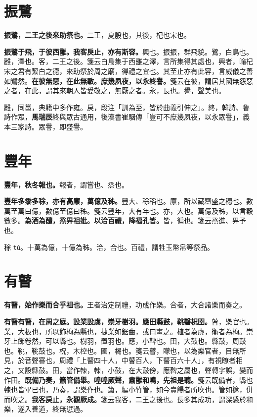 \section{振鷺}


\textbf{振鷺，二王之後來助祭也。}{\footnotesize 二王，夏殷也，其後，杞也宋也。}

\textbf{振鷺于飛，于彼西雝。我客戾止，亦有斯容。}{\footnotesize 興也。振振，群飛貌。鷺，白鳥也。雝，澤也。客，二王之後。箋云白鳥集于西雝之澤，言所集得其處也，興者，喻杞宋之君有絜白之德，來助祭於周之廟，得禮之宜也。其至止亦有此容，言威儀之善如鷺然。}\textbf{在彼無惡，在此無斁。庶幾夙夜，以永終譽。}{\footnotesize 箋云在彼，謂居其國無怨惡之者，在此，謂其來朝人皆愛敬之，無厭之者。永，長也。譽，聲美也。}

\begin{quoting}雝，同邕，典籍中多作雍。戾，段注「訓為至，皆於曲義引伸之」。終，韓詩、魯詩作眾，\textbf{馬瑞辰}終與眾古通用，後漢書崔駰傳「豈可不庶幾夙夜，以永眾譽」，義本三家詩。眾譽，即盛譽。\end{quoting}

\section{豐年}


\textbf{豐年，秋冬報也。}{\footnotesize 報者，謂嘗也、烝也。}

\textbf{豐年多黍多稌，亦有高廪，萬億及秭。}{\footnotesize 豐大、稌稻也。廪，所以藏齍盛之穗也。數萬至萬曰億，數億至億曰秭。箋云豐年，大有年也。亦，大也。萬億及秭，以言穀數多。}\textbf{為酒為醴，烝畀祖妣。以洽百禮，降福孔皆。}{\footnotesize 皆，徧也。箋云烝進、畀予也。}

\begin{quoting}稌 \texttt{tú}。十萬為億，十億為秭。洽，合也。百禮，謂牲玉幣帛等祭品。\end{quoting}

\section{有瞽}


\textbf{有瞽，始作樂而合乎祖也。}{\footnotesize 王者治定制禮，功成作樂。合者，大合諸樂而奏之。}

\textbf{有瞽有瞽，在周之庭。設業設虡，崇牙樹羽。應田縣鼓，鞉磬柷圉。}{\footnotesize 瞽，樂官也。業，大板也，所以飾栒為縣也，捷業如鋸齒，或曰畫之。植者為虡，衡者為栒。崇牙上飾卷然，可以縣也。樹羽，置羽也。應，小鞞也。田，大鼓也。縣鼓，周鼓也。鞉，鞉鼓也。柷，木椌也。圉，楬也。箋云瞽，矇也，以為樂官者，目無所見，於音聲審也，周禮「上瞽四十人，中瞽百人，下瞽百六十人」，有視瞭者相之，又設縣鼓。田，當作朄，朄，小鼓，在大鼓傍，應鞞之屬也，聲轉字誤，變而作田。}\textbf{既備乃奏，簫管備舉。喤喤厥聲，肅雝和鳴，先祖是聽。}{\footnotesize 箋云既備者，縣也朄也皆畢已也，乃奏，謂樂作也。簫，編小竹管，如今賣餳者所吹也。管如篴，併而吹之。}\textbf{我客戾止，永觀厥成。}{\footnotesize 箋云我客，二王之後也。長多其成功，謂深感於和樂，遂入善道，終無愆過。}

